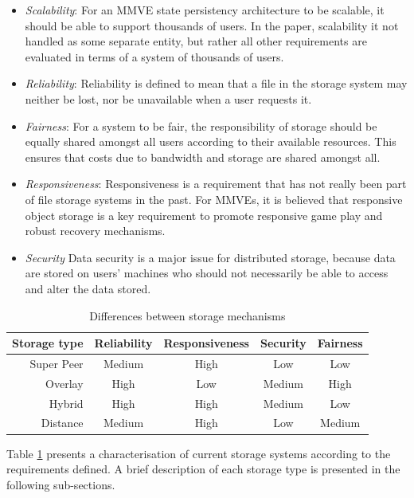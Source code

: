 \documentclass[10pt,a4paper,conference]{IEEEtran}
\begin{document}
\begin{itemize}
\item \emph{Scalability}: For an MMVE state persistency architecture to be scalable, it should be able to support thousands of users. In the
    paper, scalability it not handled as some separate entity, but rather all other requirements are evaluated in terms of a system of thousands
    of users.

\item \emph{Reliability}: Reliability is defined to mean that a file in the storage system may neither be lost, nor be unavailable when a user
    requests it.

\item \emph{Fairness}: For a system to be fair, the responsibility of storage should be equally shared amongst all users according to their
    available resources. This ensures that costs due to bandwidth and storage are shared amongst all.

\item \emph{Responsiveness}: Responsiveness is a requirement that has not really been part of file storage systems in the past. For MMVEs, it is
    believed that responsive object storage is a key requirement to promote responsive game play and robust recovery mechanisms.

\item \emph{Security} Data security is a major issue for distributed storage, because data are stored on users' machines who should not
    necessarily be able to access and alter the data stored.
\end{itemize}

\begin{table}[htbp]
\centering
\begin{tabular}{|r|c|c|c|c|}
\hline
Storage type & Reliability & Responsiveness & Security & Fairness\\
\hline
Super Peer & Medium & High & Low & Low\\
Overlay & High & Low & Medium & High\\
Hybrid & High & High & Medium & Low\\
Distance & Medium & High & Low & Medium\\
\hline
\end{tabular}
\caption{Differences between storage mechanisms} \label{tab_storage}
\end{table}
%
Table \ref{tab_storage} presents a characterisation of current storage systems according to the requirements defined. A brief description of each
storage type is presented in the following sub-sections.
\end{document}

